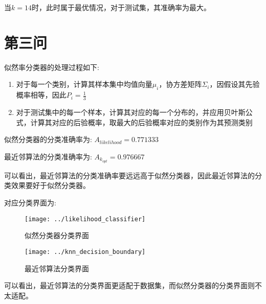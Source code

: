 \documentclass[UTF8]{article} %
\begin{document}
    当$k = 14$时，此时属于最优情况，对于测试集，其准确率为最大。


    \section{第三问}

    似然率分类器的处理过程如下:
    \begin{enumerate}
        \item 对于每一个类别，计算其样本集中均值向量$\mu_{i}$，协方差矩阵$\Sigma_{i}$，因假设其先验概率相等，因此$P_{i} = \frac{1}{3}$
        \item 对于测试集中的每一个样本，计算其对应的每一个分布的，并应用贝叶斯公式，计算其对应的后验概率，取最大的后验概率对应的类别作为其预测类别
    \end{enumerate}

    似然分类器的分类准确率为: $A_{likelihood} = 0.771333$

    最近邻算法的分类准确率为: $A_{k_{opt}} = 0.976667$

    可以看出，最近邻算法的分类准确率要远远高于似然分类器，因此最近邻算法的分类效果要好于似然分类器。

    对应分类界面为:

    \begin{figure}[htbp]
        \begin{minipage}[t]{0.5\linewidth}
            \centering
            \texttt{[image: ../likelihood\_classifier]}
            \caption{似然分类器分类界面}
        \end{minipage}%
        \begin{minipage}[t]{0.5\linewidth}
            \centering
            \texttt{[image: ../knn\_decision\_boundary]}
            \caption{最近邻算法分类界面}
        \end{minipage}
    \end{figure}

    可以看出，最近邻算法的分类界面更适配于数据集，而似然分类器的分类界面则不太适配。
\end{document}
